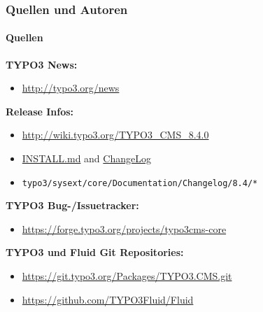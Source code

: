 \begin{frame}[fragile]
	\frametitle{Quellen und Autoren}
	\framesubtitle{Quellen}

	\textbf{TYPO3 News:}
		\begin{itemize}\smaller
			\item \url{http://typo3.org/news}
		\end{itemize}

	\textbf{Release Infos:}
		\begin{itemize}\smaller
			\item \url{http://wiki.typo3.org/TYPO3_CMS_8.4.0}
			\item \href{https://github.com/TYPO3/TYPO3.CMS/blob/master/INSTALL.md}{INSTALL.md}
				and \href{https://github.com/TYPO3/TYPO3.CMS/tree/master/typo3/sysext/core/Documentation/Changelog}{ChangeLog}
			\item \texttt{typo3/sysext/core/Documentation/Changelog/8.4/*}
		\end{itemize}

	\textbf{TYPO3 Bug-/Issuetracker:}
		\begin{itemize}\smaller
			\item \url{https://forge.typo3.org/projects/typo3cms-core}
		\end{itemize}

	\textbf{TYPO3 und Fluid Git Repositories:}
		\begin{itemize}\smaller
			\item \url{https://git.typo3.org/Packages/TYPO3.CMS.git}
			\item \url{https://github.com/TYPO3Fluid/Fluid}
		\end{itemize}

\end{frame}


